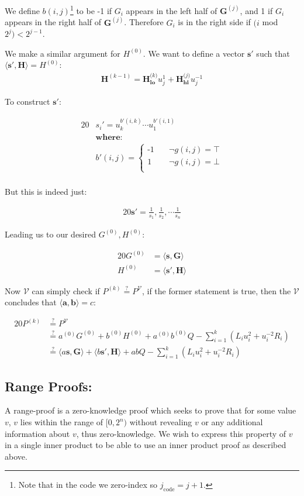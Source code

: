 \documentclass{article}
\newcommand{\eq}[1]{\begin{alignat*}{20}#1\end{alignat*}}
\newcommand{\eqn}[2]{\begin{equation}\label{#1}\begin{split}#2\end{split}\end{equation}}
\renewcommand{\vec}[1]{\boldsymbol{#1}}
\newcommand{\V}{\mathcal{V}}
\newcommand{\dotp}[2]{\langle #1, #2 \rangle}
\newcommand{\opn}[1]{\operatorname{#1}}
\newcommand{\veclo}[1]{\vec{#1_{\opn{lo}}}}
\newcommand{\vechi}[1]{\vec{#1_{\opn{hi}}}}
\begin{document}
We define $b(i,j)$\footnote{Note that in the code we zero-index
so $j_{\text{code}} = j+1$.} to be -1 if $G_i$ appears in the left
half of $\vec{G}^{(j)}$, and 1 if $G_i$ appears in the right half
of $\vec{G}^{(j)}$. Therefore $G_i$ is in the right side if
$(i$ mod $2^j) < 2^{j-1}$.

We make a similar argument for $H^{(0)}$. We want to define a vector
$\vec{s'}$ such that $\dotp{\vec{s'}}{\vec{H}} = H^{(0)}$:
\eqn{H0}{
	\vec{H}^{(k-1)} = \veclo{H^\textit{(k)}} u^{1}_j + \vechi{H^\textit{(j)}} u^{-1}_j
}

To construct $\vec{s'}$:

\eq{
	&s_i' = u^{b'(i,k)}_k \cdots u^{b'(i,1)}_1 \\
	&\textbf{where:} \\
	&b'(i,j) = 
	\begin{cases}
		\text{-1} &\quad  \lnot g(i,j) = \top \\
		\text{1}  &\quad  \lnot g(i,j) = \bot \\
	\end{cases} \\
}

But this is indeed just:

\eq{
	\vec{s'} = \frac{1}{s_1}, \frac{1}{s_2}, \cdots \frac{1}{s_n}
}

Leading us to our desired $G^{(0)}, H^{(0)}$:

\eq{
	G^{(0)} &= \dotp{\vec{s}}{\vec{G}} \\
	H^{(0)} &= \dotp{\vec{s'}}{\vec{H}}
}

Now $\V$ can simply check if $P^{(k)} \stackrel{?}{=} P^{\V}$,
if the former statement is true, then the $\V$ concludes that
$\dotp{\vec{a}}{\vec{b}} = c$:

\eq{
	P^{(k)} &\stackrel{?}{=} P^{\V} \\
	        &\stackrel{?}{=} a^{(0)}G^{(0)} + b^{(0)}H^{(0)} + a^{(0)}b^{(0)}Q - \sum^k_{i=1} (L_i u^2_i + u^{-2}_i R_i) \\
	        &\stackrel{?}{=} \dotp{a\vec{s}}{\vec{G}} + \dotp{b\vec{s'}}{\vec{H}} + abQ - \sum^k_{i=1} (L_i u^2_i + u^{-2}_i R_i)
}

\subsection{Range Proofs:}\label{range-proofs}

A range-proof is a zero-knowledge proof which seeks to prove that for
some value $v$, $v$ lies within the range of $[0,2^n)$ without revealing
$v$ or any additional information about $v$, thus zero-knowledge. We
wish to express this property of $v$ in a single inner product to be
able to use an inner product proof as described above.
\end{document}
